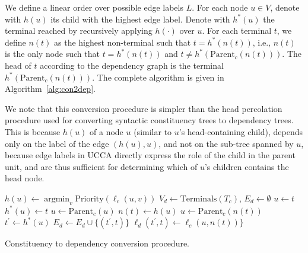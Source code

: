 \documentclass[11pt]{article}
\DeclareMathOperator*{\argmin}{argmin}
\begin{document}
We define a linear order over possible edge labels $L$.
For each node $u \in V$, denote with $h(u)$ its child with the highest edge label.
Denote with $h^*(u)$ the terminal reached by recursively applying $h(\cdot)$ over $u$.
For each terminal $t$, we define $n(t)$ as the highest
non-terminal such that $t=h^*(n(t))$, i.e.,
$n(t)$ is the only node such that $t=h^*(n(t))$ and $t \neq h^*(\mathrm{Parent}_c(n(t)))$.
The head of $t$ according to the dependency graph is
the terminal $h^*(\mathrm{Parent}_c(n(t)))$.
The complete algorithm is given in Algorithm~\ref{alg:con2dep}.

We note that this conversion procedure is simpler than the
head percolation procedure used for converting syntactic constituency
trees to dependency trees.
This is because $h(u)$ of a node $u$ (similar to $u$'s head-containing child),
depends only on the label of the edge $(h(u),u)$, and not on the sub-tree spanned by $u$,
because edge labels in UCCA directly express the role of the child in the parent unit, and
are thus sufficient for determining which of $u$'s children contains the head node.

\begin{algorithm}[t]
  \small
  {
  $h(u) \leftarrow \argmin_v \mathrm{Priority}(\ell_c(u,v))$\;
 }
 $V_d \leftarrow \mathrm{Terminals}({T_c})$,
 $E_d \leftarrow \emptyset$\;
  {
  $u \leftarrow t$\;
   {
  	$h^*(u) \leftarrow t$\;
  	$u \leftarrow \mathrm{Parent}_c(u)$\;
  }
  $n(t) \leftarrow h(u)$\;
 }
  {
  $u \leftarrow \mathrm{Parent}_c(n(t))$\;
  $t^\prime \leftarrow h^*(u)$\;
  $E_d \leftarrow E_d \cup \{(t^\prime, t)\}$\;
  $\ell_d (t^\prime, t) \leftarrow \ell_c(u, n(t))\}$\;
 }
 \caption{\small Constituency to dependency conversion procedure.}
 \label{alg:con2dep}
\end{algorithm}
\end{document}
